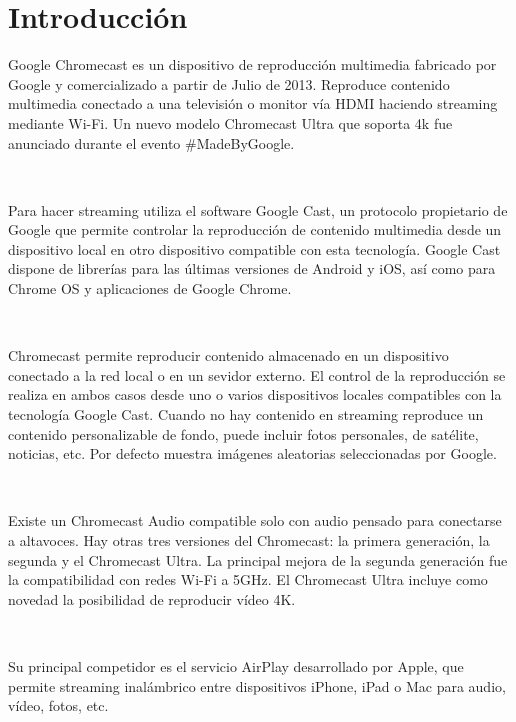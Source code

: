 \section{Introducción}
Google Chromecast es un dispositivo de reproducción multimedia fabricado por Google y comercializado a partir de Julio de 2013. Reproduce contenido multimedia conectado a una televisión o monitor vía HDMI haciendo streaming mediante Wi-Fi. Un nuevo modelo Chromecast Ultra que soporta 4k fue anunciado durante el evento \#MadeByGoogle.

\

Para hacer streaming utiliza el software Google Cast, un protocolo propietario de Google que permite controlar la reproducción de contenido multimedia desde un dispositivo local en otro dispositivo compatible con esta tecnología. Google Cast dispone de librerías para las últimas versiones de Android y iOS, así como para Chrome OS y aplicaciones de Google Chrome.

\

Chromecast permite reproducir contenido almacenado en un dispositivo conectado a la red local o en un sevidor externo. El control de la reproducción se realiza en ambos casos desde uno o varios dispositivos locales compatibles con la tecnología Google Cast. Cuando no hay contenido en streaming reproduce un contenido personalizable de fondo, puede incluir fotos personales,
de satélite, noticias, etc. Por defecto muestra imágenes aleatorias seleccionadas por Google.

\

Existe un Chromecast Audio compatible solo con audio pensado para conectarse a altavoces. Hay otras tres versiones del Chromecast: la primera generación, la segunda y el Chromecast Ultra. La principal mejora de la segunda generación fue la compatibilidad con redes Wi-Fi a 5GHz. El Chromecast Ultra incluye como novedad la posibilidad de reproducir vídeo 4K.

\

Su principal competidor es el servicio AirPlay desarrollado por Apple, que permite streaming inalámbrico entre dispositivos iPhone, iPad o Mac para audio, vídeo, fotos, etc.
